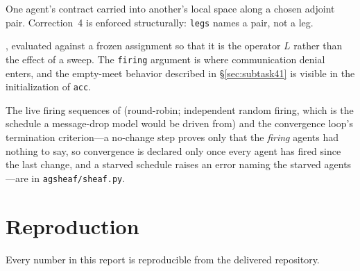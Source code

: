 \documentclass[11pt]{article}
\theoremstyle{definition}
\theoremstyle{remark}
\begin{document}
\begin{description}[leftmargin=1.6em]
\item[\texttt{transport} (Listing~1).]
  One agent's contract carried into another's local space along a chosen adjoint pair.
  Correction~4 is enforced structurally: \texttt{legs} names a pair, not a leg.
\item[\texttt{laplacian} (Listing~2).]
  , evaluated against a frozen assignment so that it is the operator
  $L$ rather than the effect of a sweep. The \texttt{firing} argument is where communication
  denial enters, and the empty-meet behavior described in \S\ref{sec:subtask41}
  is visible in the initialization of \texttt{acc}.
\end{description}

The live firing sequences of  (round-robin; independent random firing,
which is the schedule a message-drop model would be driven from) and the convergence loop's
termination criterion---a no-change step proves only that the \emph{firing} agents had nothing
to say, so convergence is declared only once every agent has fired since the last change, and
a starved schedule raises an error naming the starved agents---are in
\texttt{agsheaf/sheaf.py}.

\section{Reproduction}
\label{sec:repro}

Every number in this report is reproducible from the delivered repository.
\end{document}
